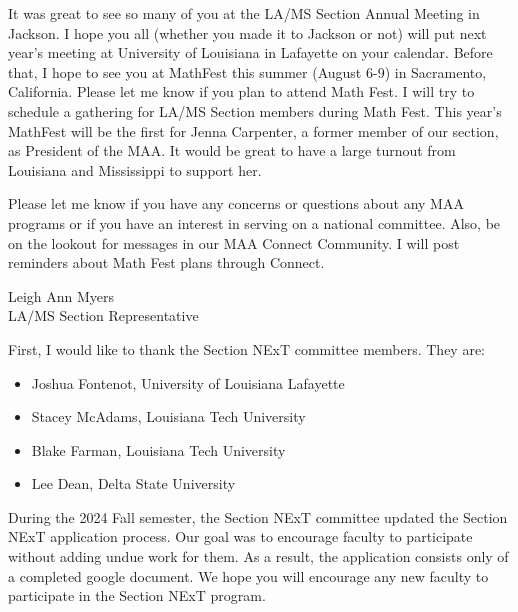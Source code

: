\documentclass[10pt]{article} %
\begin{document}
\begin{minipage}[t]{.95\linewidth}
  \begin{multicols}{2}
    \hypertarget{message-sectionrep}{} %
    It was great to see so many of you at the LA/MS Section Annual Meeting in Jackson.
    I hope you all (whether you made it to Jackson or not) will put next year’s meeting at University of Louisiana in Lafayette on your calendar.
    Before that, I hope to see you at MathFest this summer (August 6-9) in Sacramento, California.
    Please let me know if you plan to attend Math Fest.
    I will try to schedule a gathering for LA/MS Section members during Math Fest.
    This year’s MathFest will be the first for Jenna Carpenter, a former member of our section, as President of the MAA.
    It would be great to have a large turnout from Louisiana and Mississippi to support her.
    
    Please let me know if you have any concerns or questions about any MAA programs or if you have an interest in serving on a national committee.
    Also, be on the lookout for messages in our MAA Connect Community.
    I will post reminders about Math Fest plans through Connect.

    Leigh Ann Myers\\
    LA/MS Section Representative

    \BackToContents %
    
    \hypertarget{sectionnext}{} %

    First, I would like to thank the Section NExT committee members. They are: 

    \begin{itemize}
    \item
      Joshua Fontenot, University of Louisiana Lafayette
    \item
      Stacey McAdams, Louisiana Tech University
    \item
      Blake Farman, Louisiana Tech University
    \item
      Lee Dean, Delta State University
    \end{itemize}

    During the 2024 Fall semester, the Section NExT committee updated the Section NExT application process. Our goal was to encourage faculty to participate without adding undue work for them. As a result, the application consists only of a completed google document. We hope you will encourage any new faculty to participate in the Section NExT program. 


\end{multicols}
\end{minipage}
\end{document}
